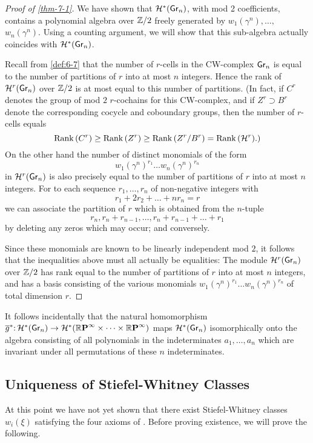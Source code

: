 \begin{proof}[Proof of \cref{thm-7-1}]
	We have shown that $\homology^{*}(\grass{n}{})$, with mod 2 coefficients, contains a polynomial algebra over $\mathbb{Z} / 2$ freely generated by $w_{1}(\gamma^{n}), \dots,$ $w_{n}(\gamma^{n})$. Using a counting argument, we will show that this sub-algebra actually coincides with $\homology^{*}(\grass{n}{})$.
	
	Recall from \cref{def:6-7} that the number of $r$-cells in the CW-complex $\grass{n}{}$ is equal to the number of partitions of $r$ into at most $n$ integers. Hence the rank of $\homology^{r}(\grass{n}{})$ over $\mathbb{Z} / 2$ is at most equal to this number of partitions. (In fact, if $C^{r}$ denotes the group of mod $2$ $r$-cochains for this CW-complex, and if $Z^{r} \supset B^{r}$ denote the corresponding cocycle and coboundary groups, then the number of $r$-cells equals
	\[
	\mathrm{Rank}\,(C^{r}) \geq \mathrm{Rank}\,(Z^{r}) \geq \mathrm{Rank}\,(Z^{r} / B^{r})=\mathrm{Rank}\,(\mathcal{H}^{r}) \text{.)}
	\]
	On the other hand the number of distinct monomials of the form
	\[w_{1}(\gamma^{n})^{r_{1}} \dots w_{n}(\gamma^{n})^{r_n}\]
	in $\homology^{r}(\grass{n}{})$ is also precisely equal to the number of partitions of $r$ into at most $n$ integers. For to each sequence $r_{1}, \dots, r_{n}$ of non-negative integers with
	\[
	r_{1}+2 r_{2}+\dots+nr_{n}=r
	\]
	we can associate the partition of $r$ which is obtained from the $n$-tuple
	\[
	r_{n}, r_{n}+r_{n-1}, \dots, r_{n}+r_{n-1}+\dots+r_{1}
	\]
	by deleting any zeros which may occur; and conversely.
	
	Since these monomials are known to be linearly independent mod $2$, it follows that the inequalities above must all actually be equalities: The module $\homology^{r}(\grass{n}{})$ over $\mathbb{Z} / 2$ has rank equal to the number of partitions of $r$ into at most $n$ integers, and has a basis consisting of the various monomials $w_{1}(\gamma^{n})^{r_{1}} \dots w_{n}(\gamma^{n})^{r_{n}}$ of total dimension $r$.
\end{proof} 

It follows incidentally that the natural homomorphism $\map{\overline{g}^{*}}{\homology^{*}(\grass{n}{})}{\homology^{*}(\rp{\infty} \times \dots \times \rp{\infty})}$ maps $\homology^{*}(\grass{n}{})$ isomorphically onto the algebra consisting of all polynomials in the indeterminates $a_{1}, \dots, a_{n}$ which are invariant under all permutations of these $n$ indeterminates.

\subsection*{Uniqueness of Stiefel-Whitney Classes}
At this point we have not yet shown that there exist Stiefel-Whitney classes $w_{i}(\xi)$ satisfying the four axioms of . Before proving existence, we will prove the following.


